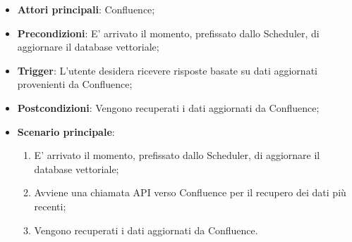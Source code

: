 \hypertarget{UC11.3}{}
\begin{itemize}
    \item \textbf{Attori principali}: Confluence;
    \item \textbf{Precondizioni}: E' arrivato il momento, prefissato dallo Scheduler, di aggiornare il database vettoriale;
    \item \textbf{Trigger}: L'utente desidera ricevere risposte basate su dati aggiornati provenienti da Confluence;
    \item \textbf{Postcondizioni}: Vengono recuperati i dati aggiornati da Confluence;
    \item \textbf{Scenario principale}: 
    \begin{enumerate}
        \item E' arrivato il momento, prefissato dallo Scheduler, di aggiornare il database vettoriale;
        \item Avviene una chiamata API verso Confluence per il recupero dei dati più recenti;
        \item Vengono recuperati i dati aggiornati da Confluence.
    \end{enumerate}
\end{itemize}

